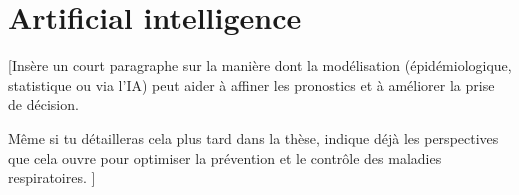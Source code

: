 


\clearpage 


\section{Artificial intelligence}

[Insère un court paragraphe sur la manière dont la modélisation (épidémiologique, statistique ou via l’IA) peut aider à affiner les pronostics et à améliorer la prise de décision.

Même si tu détailleras cela plus tard dans la thèse, indique déjà les perspectives que cela ouvre pour optimiser la prévention et le contrôle des maladies respiratoires. ]

